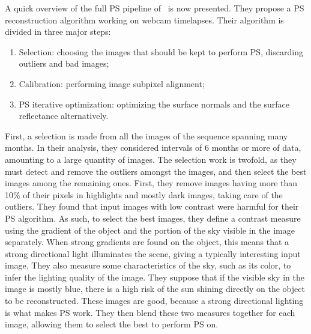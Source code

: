 A quick overview of the full PS pipeline of~\cite{ackermann-cvpr-12} is now presented. They propose a PS reconstruction algorithm working on webcam timelapses. Their algorithm is divided in three major steps: 
\begin{enumerate}
  \item Selection: choosing the images that should be kept to perform PS, discarding outliers and bad images;
  \item Calibration: performing image subpixel alignment;
  \item PS iterative optimization: optimizing the surface normals and the surface reflectance alternatively.
\end{enumerate}%
First, a selection is made from all the images of the sequence spanning many months. In their analysis, they considered intervals of 6 months or more of data, amounting to a large quantity of images. The selection work is twofold, as they must detect and remove the outliers amongst the images, and then select the best images among the remaining ones. First, they remove images having more than 10\% of their pixels in highlights and mostly dark images, taking care of the outliers. They found that input images with low contrast were harmful for their PS algorithm. As such, to select the best images, they define a contrast measure using the gradient of the object and the portion of the sky visible in the image separately. When strong gradients are found on the object, this means that a strong directional light illuminates the scene, giving a typically interesting input image. They also measure some characteristics of the sky, such as its color, to infer the lighting quality of the image. They suppose that if the visible sky in the image is mostly blue, there is a high risk of the sun shining directly on the object to be reconstructed. These images are good, because a strong directional lighting is what makes PS work. They then blend these two measures together for each image, allowing them to select the best to perform PS on.

